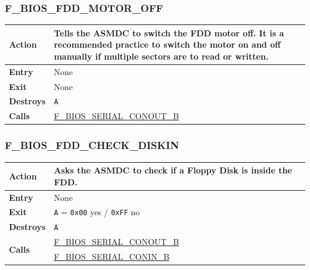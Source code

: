 \documentclass[a4paper,11pt]{article}
\begin{document}
        \subsubsection{F\_BIOS\_FDD\_MOTOR\_OFF}
        \label{func:fbiosfddmotoroff}
        \begin{tabular}{l p{9cm}}
            \hline\textbf{Action}
            & Tells the \textbf{ASMDC} to switch the \textbf{FDD} motor off. It
            is a recommended practice to switch the motor on and off manually
            if multiple sectors are to read or written.\\
            \hline\textbf{Entry} & None \\
            \hline\textbf{Exit} & None \\
            \hline\textbf{Destroys} & \texttt{A} \\
            \hline\textbf{Calls}
            & \hyperref[func:fbiosserialconoutb]{F\_BIOS\_SERIAL\_CONOUT\_B}\\
            \hline
        \end{tabular}

        \subsubsection{F\_BIOS\_FDD\_CHECK\_DISKIN}
        \label{func:fbiosfddcheckdiskin}
        \begin{tabular}{l p{9cm}}
            \hline\textbf{Action}
            & Asks the \textbf{ASMDC} to check if a Floppy Disk is inside the
            \textbf{FDD}.\\
            \hline\textbf{Entry} & None \\
            \hline\textbf{Exit} & \texttt{A} = \texttt{0x00} yes / \texttt{0xFF}
            no \\
            \hline\textbf{Destroys} & \texttt{A} \\
            \hline\multirow[t]{2}{4em}{\textbf{Calls}}
            & \hyperref[func:fbiosserialconoutb]{F\_BIOS\_SERIAL\_CONOUT\_B}\\
            & \hyperref[func:fbiosserialconinb]{F\_BIOS\_SERIAL\_CONIN\_B}\\
            \hline
        \end{tabular}
\end{document}
